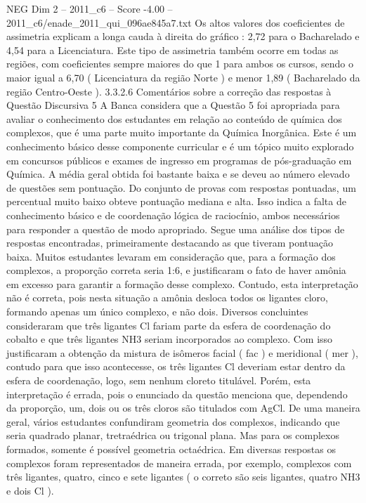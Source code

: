 \begin{textsample}{NEG Dim 2 – 2011\_c6 – Score -4.00 – 2011\_c6/enade\_2011\_qui\_096ae845a7.txt}
Os altos valores dos coeficientes de assimetria explicam a longa cauda à direita do gráfico : 2,72 para o Bacharelado e 4,54 para a Licenciatura.
Este tipo de assimetria também ocorre em todas as regiões, com coeficientes sempre maiores do que 1 para ambos os cursos, sendo o maior igual a 6,70 ( Licenciatura da região Norte ) e menor 1,89 ( Bacharelado da região Centro-Oeste ). 3.3.2.6 Comentários sobre a correção das respostas à Questão Discursiva 5 A Banca considera que a Questão 5 foi apropriada para avaliar o conhecimento dos estudantes em relação ao conteúdo de química dos complexos, que é uma parte muito importante da Química Inorgânica.
Este é um conhecimento básico desse componente curricular e é um tópico muito explorado em concursos públicos e exames de ingresso em programas de pós-graduação em Química.
A média geral obtida foi bastante baixa e se deveu ao número elevado de questões sem pontuação.
Do conjunto de provas com respostas pontuadas, um percentual muito baixo obteve pontuação mediana e alta.
Isso indica a falta de conhecimento básico e de coordenação lógica de raciocínio, ambos necessários para responder a questão de modo apropriado.
Segue uma análise dos tipos de respostas encontradas, primeiramente destacando as que tiveram pontuação baixa.
Muitos estudantes levaram em consideração que, para a formação dos complexos, a proporção correta seria 1:6, e justificaram o fato de haver amônia em excesso para garantir a formação desse complexo.
Contudo, esta interpretação não é correta, pois nesta situação a amônia desloca todos os ligantes cloro, formando apenas um único complexo, e não dois.
Diversos concluintes consideraram que três ligantes Cl fariam parte da esfera de coordenação do cobalto e que três ligantes NH3 seriam incorporados ao complexo.
Com isso justificaram a obtenção da mistura de isômeros facial ( fac ) e meridional ( mer ), contudo para que isso acontecesse, os três ligantes Cl deveriam estar dentro da esfera de coordenação, logo, sem nenhum cloreto titulável.
Porém, esta interpretação é errada, pois o enunciado da questão menciona que, dependendo da proporção, um, dois ou os três cloros são titulados com AgCl.
De uma maneira geral, vários estudantes confundiram geometria dos complexos, indicando que seria quadrado planar, tretraédrica ou trigonal plana.
Mas para os complexos formados, somente é possível geometria octaédrica.
Em diversas respostas os complexos foram representados de maneira errada, por exemplo, complexos com três ligantes, quatro, cinco e sete ligantes ( o correto são seis ligantes, quatro NH3 e dois Cl ).

\end{textsample}
